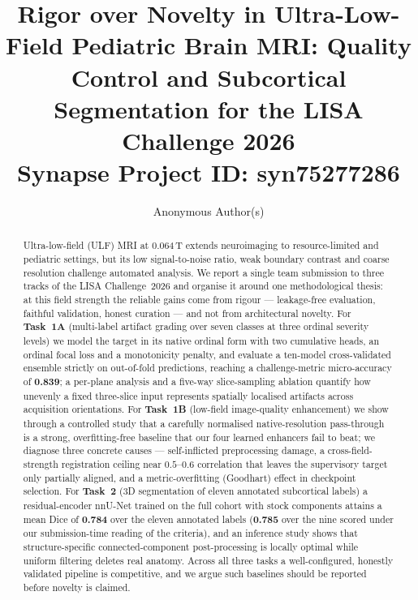 \documentclass[runningheads]{llncs}
\begin{document}
\title{Rigor over Novelty in Ultra-Low-Field Pediatric Brain MRI:
Quality Control and Subcortical Segmentation for the LISA Challenge 2026\\
\large Synapse Project ID: syn75277286}

\author{Anonymous Author(s)}


\maketitle

\begin{abstract}
Ultra-low-field (ULF) MRI at 0.064\,T extends neuroimaging to resource-limited
and pediatric settings, but its low signal-to-noise ratio, weak boundary
contrast and coarse resolution challenge automated analysis. We report a single
team submission to three tracks of the LISA Challenge~2026 and organise it around
one methodological thesis: at this field strength the reliable gains come from
rigour --- leakage-free evaluation, faithful validation, honest curation --- and
not from architectural novelty. For \textbf{Task~1A} (multi-label artifact
grading over seven classes at three ordinal severity levels) we model the target
in its native ordinal form with two cumulative heads, an ordinal focal loss and a
monotonicity penalty, and evaluate a ten-model cross-validated ensemble strictly
on out-of-fold predictions, reaching a challenge-metric micro-accuracy of
\textbf{0.839}; a per-plane analysis and a five-way slice-sampling
ablation quantify how unevenly a fixed three-slice input represents spatially
localised artifacts across acquisition orientations. For \textbf{Task~1B} (low-field image-quality enhancement) we
show through a controlled study that a carefully normalised native-resolution
pass-through is a strong, overfitting-free baseline that our four learned
enhancers fail to beat; we diagnose three concrete causes --- self-inflicted
preprocessing damage, a cross-field-strength registration ceiling near
$0.5$--$0.6$ correlation that leaves the supervisory target only partially
aligned, and a
metric-overfitting (Goodhart) effect in checkpoint selection. For
\textbf{Task~2} (3D segmentation of eleven annotated subcortical labels) a
residual-encoder nnU-Net trained on the full cohort with stock components attains
a mean Dice of \textbf{0.784} over the eleven annotated labels
(\textbf{0.785} over the nine scored under our submission-time reading of the
criteria), and an inference study shows that
structure-specific connected-component post-processing is locally optimal while
uniform filtering deletes real anatomy. Across all three tasks a well-configured,
honestly validated pipeline is competitive, and we argue such baselines should be
reported before novelty is claimed.
\end{abstract}
\end{document}
